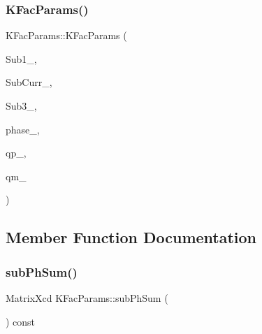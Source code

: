 \subsubsection{\texorpdfstring{KFacParams()}{KFacParams()}}
{\footnotesize\ttfamily K\+Fac\+Params\+::\+K\+Fac\+Params (\begin{DoxyParamCaption}\item[{map$<$ int, Eigen\+::\+Matrix\+Xcd $>$}]{Sub1\+\_\+,  }\item[{map$<$ int, Eigen\+::\+Matrix\+Xcd $>$}]{Sub\+Curr\+\_\+,  }\item[{map$<$ int, Eigen\+::\+Matrix\+Xcd $>$}]{Sub3\+\_\+,  }\item[{\mbox{\hyperlink{structPh_1_1phChars}{Ph\+::ph\+Chars}}}]{phase\+\_\+,  }\item[{Vector\+Xd}]{qp\+\_\+,  }\item[{Vector\+Xd}]{qm\+\_\+ }\end{DoxyParamCaption})}



\subsection{Member Function Documentation}
\mbox{\label{classKFacParams_a0f22066b9390b3a28b78d9c679c71f90}} 
\subsubsection{\texorpdfstring{subPhSum()}{subPhSum()}}
{\footnotesize\ttfamily Matrix\+Xcd K\+Fac\+Params\+::sub\+Ph\+Sum (\begin{DoxyParamCaption}{ }\end{DoxyParamCaption}) const\hspace{0.3cm}{\ttfamily [virtual]}}

